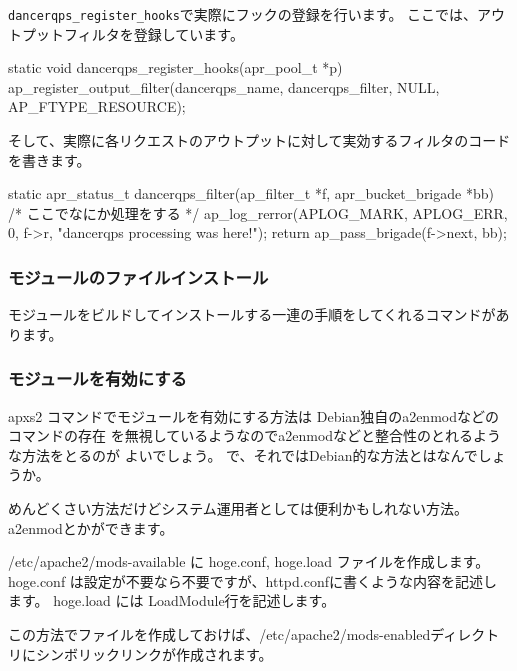 \documentclass[mingoth,a4paper]{jsarticle}
\begin{document}
\verb!dancerqps_register_hooks!で実際にフックの登録を行います。
ここでは、アウトプットフィルタを登録しています。
\begin{commandline}
static void dancerqps_register_hooks(apr_pool_t *p) {
  ap_register_output_filter(dancerqps_name, dancerqps_filter,
			    NULL, AP_FTYPE_RESOURCE);
}
\end{commandline}

そして、実際に各リクエストのアウトプットに対して実効するフィルタのコード
を書きます。

\begin{commandline}
static apr_status_t dancerqps_filter(ap_filter_t *f, apr_bucket_brigade *bb) {
  /* ここでなにか処理をする */
  ap_log_rerror(APLOG_MARK, APLOG_ERR, 0, f->r,
		"dancerqps processing was here!");
  return ap_pass_brigade(f->next, bb);
}
\end{commandline}

\subsubsection{モジュールのファイルインストール}

モジュールをビルドしてインストールする一連の手順をしてくれるコマンドがあ
ります。


\subsubsection{モジュールを有効にする}

apxs2 コマンドでモジュールを有効にする方法は Debian独自のa2enmodなどのコマンドの存在
を無視しているようなのでa2enmodなどと整合性のとれるような方法をとるのが
よいでしょう。
で、それではDebian的な方法とはなんでしょうか。


めんどくさい方法だけどシステム運用者としては便利かもしれない方法。
a2enmodとかができます。

/etc/apache2/mods-available に hoge.conf, hoge.load ファイルを作成します。
hoge.conf は設定が不要なら不要ですが、httpd.confに書くような内容を記述し
ます。
hoge.load には LoadModule行を記述します。

この方法でファイルを作成しておけば、/etc/apache2/mods-enabledディレクト
リにシンボリックリンクが作成されます。
\end{document}
